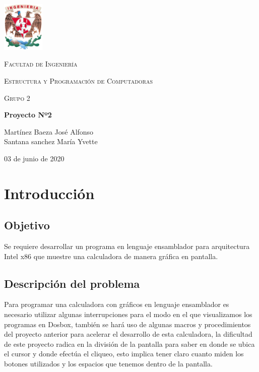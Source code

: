 \documentclass[letterpaper,12 pt,titlepage]{article}
\begin{document}
    \begin{titlepage}
        \centering
        \includegraphics[width=0.15\textwidth]{img/escudo_fi_color.png}\par\vspace{1cm}
        {\scshape\LARGE Facultad de Ingeniería \par}
        \vspace{1cm}
        {\scshape\Large Estructura y Programación de Computadoras
        \par}
        \vspace{1cm}
        {\scshape\Large Grupo 2
        \par}
        \vspace{1.5cm}
        {\huge\bfseries Proyecto Nº2\par}
        \vspace{2cm}
        {\Large 
            Martínez Baeza José Alfonso\\
            Santana sanchez María Yvette
        \par}
        \vfill
        {\large 03 de junio de 2020\par}
    \end{titlepage}

    \tableofcontents
    \newpage

    \section{Introducción}

    \subsection{Objetivo}
        Se requiere desarrollar un programa en lenguaje ensamblador para arquitectura Intel x86 que muestre una calculadora de manera gráfica en pantalla.

    \subsection{Descripción del problema}
        Para programar una calculadora con gráficos en lenguaje ensamblador es necesario utilizar algunas interrupciones para el modo en el que visualizamos los programas en Dosbox, también se hará uso de algunas macros y procedimientos del proyecto anterior para acelerar el desarrollo de esta calculadora, la dificultad de este proyecto radica en la división de la pantalla para saber en donde se ubica el cursor y donde efectúa el cliqueo, esto implica tener claro cuanto miden los botones utilizados y los espacios que tenemos dentro de la pantalla. 
\end{document}
